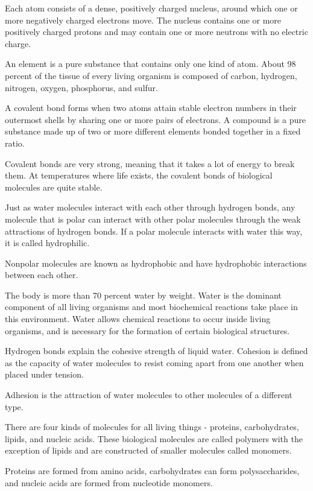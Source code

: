 \documentclass[../bio.tex]{subfiles}
\begin{document}
Each atom consists of a dense, positively charged nucleus, around which
one or more negatively charged electrons move. The nucleus contains one or more
positively charged protons and may contain one or more neutrons with no electric charge.

An element is a pure substance that contains only one kind of atom. About 98
percent of the tissue of every living organism is composed of carbon, hydrogen, 
nitrogen, oxygen, phosphorus, and sulfur.

A covalent bond forms when two atoms attain stable electron numbers in their outermost
shells by sharing one or more pairs of electrons. A compound is a pure substance
made up of two or more different elements bonded together in a fixed ratio.

Covalent bonds are very strong, meaning that it takes a lot of energy to break them.
At temperatures where life exists, the covalent bonds of biological molecules
are quite stable.

Just as water molecules interact with each other through hydrogen bonds, any molecule
that is polar can interact with other polar molecules through the weak attractions of hydrogen bonds.
If a polar molecule interacts with water this way, it is called hydrophilic.

Nonpolar molecules are known as hydrophobic and have hydrophobic interactions between each other.

The body is more than 70 percent water by weight. Water is the dominant component
of all living organisms and most biochemical reactions take place in this environment.
Water allows chemical reactions to occur inside living organisms, and is necessary for the formation
of certain biological structures. 

Hydrogen bonds explain the cohesive strength of liquid water. Cohesion is defined
as the capacity of water molecules to resist coming apart from one another when placed under tension.

Adhesion is the attraction of water molecules to other molecules of a different type.

There are four kinds of molecules for all living things - proteins, carbohydrates,
lipids, and nucleic acids. These biological molecules are called polymers with the exception of lipids and are constructed of smaller molecules called monomers.

Proteins are formed from amino acids, carbohydrates can form polysaccharides, and nucleic acids are formed from nucleotide monomers.
\end{document}
